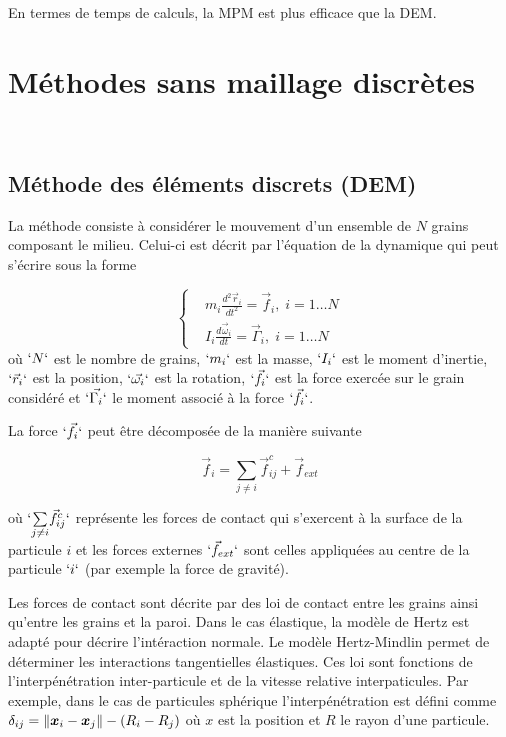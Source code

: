 En termes de temps de calculs, la MPM est plus efficace que la DEM.

\section{Méthodes sans maillage discrètes}~\label{sec:part_discret}

\subsection{Méthode des éléments discrets (DEM)}

La méthode consiste à considérer le mouvement d'un ensemble de $N$ grains composant le milieu. Celui-ci est décrit par l'équation de la dynamique qui peut s'écrire sous la forme

\begin{equation*}
    \left\{
    \begin{aligned}
         & m_{i} \frac{ d^{2}\vec{r}_i }{dt^2}=\vec{f}_{i},\; i=1\ldots N      \\
         & I_{i} \frac{d \vec{\omega}_{i}}{dt}=\vec{\Gamma}_{i},\; i=1\ldots N
    \end{aligned}
    \right.
\end{equation*}où $`N`$ est le nombre de grains, $`m_{i}`$ est la masse, $`I_i`$ est le moment d'inertie, $`\vec{r}_{i}`$ est la position, $`\vec{\omega_{i}}`$ est la rotation, $`\vec{f}_{i}`$ est la force exercée sur le grain considéré et $`\vec{\Gamma_{i}}`$ le moment associé à la force $`\vec{f}_{i}`$.

La force $`\vec{f}_{i}`$ peut être décomposée de la manière suivante

\begin{equation*}
    \vec{f}_{i}=\underset{{\scriptstyle j\neq i}}{\sum}\vec{f}^{c}_{ij}+\vec{f}_{ext}
\end{equation*}

où $`\underset{{\scriptstyle j\neq i}}{\sum}\vec{f}^{c}_{ij}`$ représente les forces de contact qui s'exercent à la surface de la particule $i$ et les forces externes $`\vec{f}_{ext}`$ sont celles appliquées au centre de la particule $`i`$ (par exemple la force de gravité).

Les forces de contact sont décrite par des loi de contact entre les grains ainsi qu'entre les grains et la paroi. Dans le cas élastique, la modèle de Hertz est adapté pour décrire l'intéraction normale. Le modèle Hertz-Mindlin permet de déterminer les interactions tangentielles élastiques. Ces loi sont fonctions de l'interpénétration inter-particule et de la vitesse relative interpaticules. Par exemple, dans le cas de particules sphérique l'interpénétration est défini comme $\delta_{ij} = \left\lVert \bm x_i - \bm x_j \right\rVert - (R_i - R_j)$ où $x$  est la position et $R$ le rayon d'une particule.


